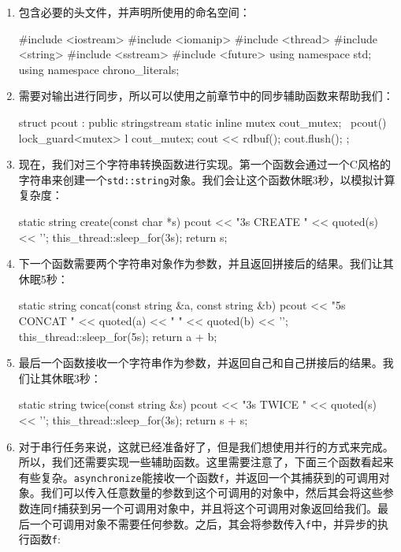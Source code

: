 \begin{enumerate}
\item 包含必要的头文件，并声明所使用的命名空间：

\begin{codebox}[cpp]
#include <iostream>
#include <iomanip>
#include <thread>
#include <string>
#include <sstream>
#include <future>
using namespace std;
using namespace chrono_literals;
\end{codebox}

\item 需要对输出进行同步，所以可以使用之前章节中的同步辅助函数来帮助我们：

\begin{codebox}[cpp]
struct pcout : public stringstream {
    static inline mutex cout_mutex;
    ~pcout() {
        lock_guard<mutex> l {cout_mutex};
        cout << rdbuf();
        cout.flush();
    }
};
\end{codebox}

\item 现在，我们对三个字符串转换函数进行实现。第一个函数会通过一个C风格的字符串来创建一个\texttt{std::string}对象。我们会让这个函数休眠3秒，以模拟计算复杂度：

\begin{codebox}[cpp]
static string create(const char *s)
{
    pcout{} << "3s CREATE " << quoted(s) << '\n';
    this_thread::sleep_for(3s);
    return {s};
}
\end{codebox}

\item 下一个函数需要两个字符串对象作为参数，并且返回拼接后的结果。我们让其休眠5秒：

\begin{codebox}[cpp]
static string concat(const string &a, const string &b)
{
    pcout{} << "5s CONCAT "
            << quoted(a) << " "
            << quoted(b) << '\n';
    this_thread::sleep_for(5s);
    return a + b;
}
\end{codebox}

\item 最后一个函数接收一个字符串作为参数，并返回自己和自己拼接后的结果。我们让其休眠3秒：

\begin{codebox}[cpp]
static string twice(const string &s)
{
    pcout{} << "3s TWICE " << quoted(s) << '\n';
    this_thread::sleep_for(3s);
    return s + s;
}
\end{codebox}

\item 对于串行任务来说，这就已经准备好了，但是我们想使用并行的方式来完成。所以，我们还需要实现一些辅助函数。这里需要注意了，下面三个函数看起来有些复杂。\texttt{asynchronize}能接收一个函数\texttt{f}，并返回一个其捕获到的可调用对象。我们可以传入任意数量的参数到这个可调用的对象中，然后其会将这些参数连同\texttt{f}捕获到另一个可调用对象中，并且将这个可调用对象返回给我们。最后一个可调用对象不需要任何参数。之后，其会将参数传入\texttt{f}中，并异步的执行函数\texttt{f}:


\end{enumerate}
